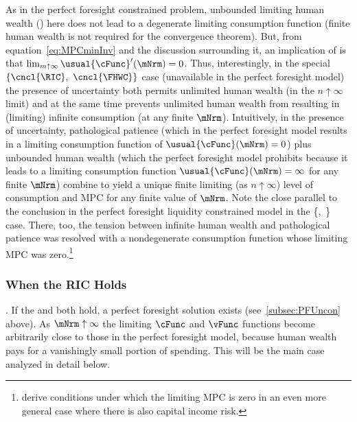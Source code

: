 \documentclass[BufferStockTheory]{subfiles}
\begin{document}
As in the perfect foresight constrained problem, unbounded limiting human wealth (\cncl{\FHWC}) here does not lead to a degenerate limiting consumption function (finite human wealth is not required for the convergence theorem).  But, from equation~\eqref{eq:MPCminInv} and the discussion surrounding it, an implication of \cncl{\RIC} is that $\lim_{m \uparrow \infty} \usual{\cFunc}^{\prime}(\mNrm) = 0$.  Thus, interestingly, in the special $\{\cncl{\RIC},~\cncl{\FHWC}\}$ case (unavailable in the perfect foresight model) the presence of uncertainty both permits unlimited human wealth (in the $n\uparrow\infty$ limit) and at the same time prevents unlimited human wealth from resulting in (limiting) infinite consumption (at any finite $\mNrm$).  Intuitively, in the presence of uncertainty, pathological patience (which in the perfect foresight model results in a limiting consumption function of $\usual{\cFunc}(\mNrm)=0$) plus unbounded human wealth (which the perfect foresight model prohibits because it leads to a limiting consumption function $\usual{\cFunc}(\mNrm)=\infty$ for any finite $\mNrm$) combine to yield a unique finite limiting (as $n \uparrow \infty$) level of consumption and MPC for any finite value of $\mNrm$.  Note the close parallel to the conclusion in the perfect foresight liquidity constrained model in the \{\GICRaw,~\cncl{\RIC}\} case.  There, too, the tension between infinite human wealth and pathological patience was resolved with a nondegenerate consumption function whose limiting MPC was zero.\footnote{\cite{maTodaRich} derive conditions under which the limiting MPC is zero in an even more general case where there is also capital income risk.}

\hypertarget{When-the-RIC-Holds}{}
\subsubsection{When the {RIC} Holds}\label{subsubsec:WhenTheGICModFails}\label{subsubsec:WhenTheRICHolds}

\textbf{\FHWC}.  If the {\RIC} and {\FHWC} both hold, a perfect foresight solution exists (see~\ref{subsec:PFUncon} above).  As $\mNrm \uparrow \infty$ the limiting $\cFunc$ and $\vFunc$ functions become arbitrarily close to those in the perfect foresight model, because human wealth pays for a vanishingly small portion of spending.  This will be the main case analyzed in detail below.
\end{document}
